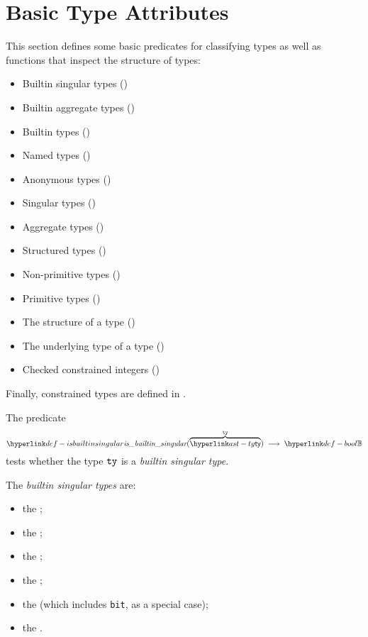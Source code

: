 \section{Basic Type Attributes\label{sec:BasicTypeAttributes}}

This section defines some basic predicates for classifying types as well as
functions that inspect the structure of types:
\begin{itemize}
  \item Builtin singular types ()
  \item Builtin aggregate types ()
  \item Builtin types ()
  \item Named types ()
  \item Anonymous types ()
  \item Singular types ()
  \item Aggregate types ()
  \item Structured types ()
  \item Non-primitive types ()
  \item Primitive types ()
  \item The structure of a type ()
  \item The underlying type of a type ()
  \item Checked constrained integers ()
\end{itemize}

Finally, constrained types are defined in .

\hypertarget{def-isbuiltinsingular}{}
The predicate
\[
  \isbuiltinsingular(\overname{\ty}{\tty}) \;\aslto\; \Bool
\]
tests whether the type $\texttt{ty}$ is a \emph{builtin singular type}.

\ProseParagraph
The \emph{builtin singular types} are:
\begin{itemize}
\item the \integertypesterm{};
\item the \realtypeterm{};
\item the \stringtypeterm{};
\item the \booleantypeterm{};
\item the \bitvectortypeterm{} (which includes \texttt{bit}, as a special case);
\item the \enumerationtypeterm{}.
\end{itemize}

